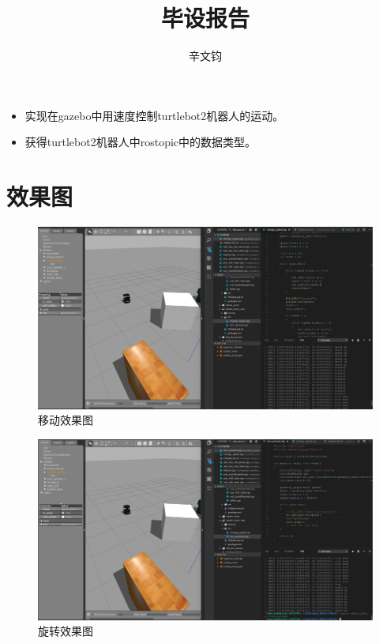 \documentclass[a4paper]{article}
\title{毕设报告}
\author{辛文钧}
\begin{document}
	\maketitle
	\begin{itemize}
		\item 实现在gazebo中用速度控制turtlebot2机器人的运动。
		\item 获得turtlebot2机器人中rostopic中的数据类型。
	\end{itemize}
	
	\section{效果图}
	\begin{figure}
		\centering
		\includegraphics[scale=0.25]{move.png}
		\caption{移动效果图}
	\end{figure}
	
	\begin{figure}
		\includegraphics[scale=0.25]{turn.png}
		\caption{旋转效果图}
	\end{figure}
	
\end{document}
